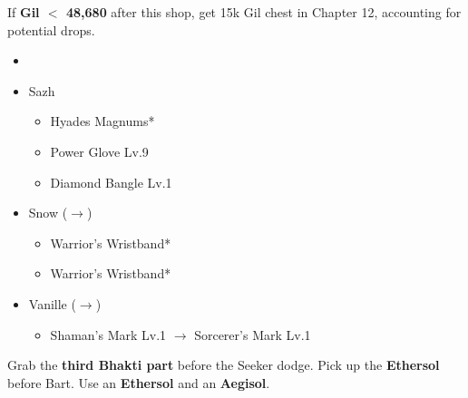 If \textbf{Gil $<$ 48,680} after this shop, get 15k Gil chest in Chapter 12, accounting for potential drops.
\vfill
\begin{menu}
	\begin{itemize}
		\paradigm
		\begin{itemize}
			\item {}%
				  {\paradigmline{\syn}{\rav}{\sab}}%
			      {\paradigmline{\com}{\rav}{\rav}}%
			      {\paradigmline{\rav}{\sen}{\med}}%
			      {\paradigmline{\com}{(\rav)}{(\rav)}}%
			      {\paradigmline[4]{\rav}{\rav}{\sab}}%
			      {\paradigmline{\com}{\rav}{\med}}%
		\end{itemize}
		\equip
		\begin{itemize}
			\item Sazh
				\begin{itemize}
					\item Hyades Magnums*
					\item Power Glove Lv.9
					\item Diamond Bangle Lv.1
				\end{itemize}
			\item Snow ($\rightarrow$)
				\begin{itemize}
					\item Warrior's Wristband*
					\item Warrior's Wristband*
				\end{itemize}
			\item Vanille ($\rightarrow$)
				\begin{itemize}
					\item Shaman's Mark Lv.1 $\rightarrow$ Sorcerer's Mark Lv.1
				\end{itemize}				
		\end{itemize}
	\end{itemize}
\end{menu}

\renewcommand{\fourth}{[4] Relentless Assault (\com/\rav/\rav)}

Grab the \textbf{third Bhakti part} before the Seeker dodge.
Pick up the \textbf{Ethersol} before Bart.
Use an \textbf{Ethersol} and an \textbf{Aegisol}.

